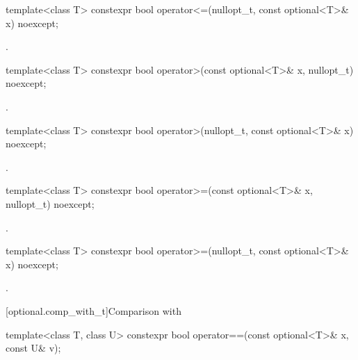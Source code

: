 %
\begin{itemdecl}
template<class T> constexpr bool operator<=(nullopt_t, const optional<T>& x) noexcept;
\end{itemdecl}

\begin{itemdescr}
\pnum
\returns
{}.
\end{itemdescr}

%
\begin{itemdecl}
template<class T> constexpr bool operator>(const optional<T>& x, nullopt_t) noexcept;
\end{itemdecl}

\begin{itemdescr}
\pnum
\returns
{}.
\end{itemdescr}

%
\begin{itemdecl}
template<class T> constexpr bool operator>(nullopt_t, const optional<T>& x) noexcept;
\end{itemdecl}

\begin{itemdescr}
\pnum
\returns
{}.
\end{itemdescr}

%
\begin{itemdecl}
template<class T> constexpr bool operator>=(const optional<T>& x, nullopt_t) noexcept;
\end{itemdecl}

\begin{itemdescr}
\pnum
\returns
{}.
\end{itemdescr}

%
\begin{itemdecl}
template<class T> constexpr bool operator>=(nullopt_t, const optional<T>& x) noexcept;
\end{itemdecl}

\begin{itemdescr}
\pnum
\returns
{}.
\end{itemdescr}

[optional.comp_with_t]{Comparison with }

%
\begin{itemdecl}
template<class T, class U> constexpr bool operator==(const optional<T>& x, const U& v);
\end{itemdecl}


